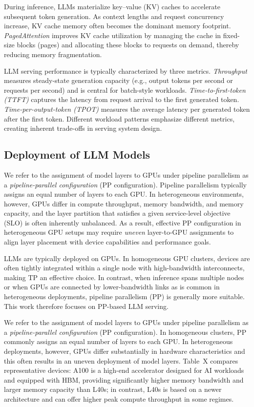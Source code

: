 \documentclass[sigplan,screen]{acmart}
\begin{document}
During inference, LLMs materialize key–value (KV) caches to accelerate subsequent token generation. As context lengths and request concurrency increase, KV cache memory often becomes the dominant memory footprint. \emph{PagedAttention} improves KV cache utilization by managing the cache in fixed-size blocks (pages) and allocating these blocks to requests on demand, thereby reducing memory fragmentation.

LLM serving performance is typically characterized by three metrics. \emph{Throughput} measures steady-state generation capacity (e.g., output tokens per second or requests per second) and is central for batch-style workloads. \emph{Time-to-first-token (TTFT)} captures the latency from request arrival to the first generated token. \emph{Time-per-output-token (TPOT)} measures the average latency per generated token after the first token. Different workload patterns emphasize different metrics, creating inherent trade-offs in serving system design.

\subsection{Deployment of LLM Models}
We refer to the assignment of model layers to GPUs under pipeline parallelism as a \emph{pipeline-parallel configuration} (PP configuration). Pipeline parallelism typically assigns an equal number of layers to each GPU. In heterogeneous environments, however, GPUs differ in compute throughput, memory bandwidth, and memory capacity, and the layer partition that satisfies a given service-level objective (SLO) is often inherently unbalanced. As a result, effective PP configuration in heterogeneous GPU setups may require \emph{uneven} layer-to-GPU assignments to align layer placement with device capabilities and performance goals.

LLMs are typically deployed on GPUs. In homogeneous GPU clusters, devices are often tightly integrated within a single node with high-bandwidth interconnects, making TP an effective choice. In contrast, when inference spans multiple nodes or when GPUs are connected by lower-bandwidth links as is common in heterogeneous deployments, pipeline parallelism (PP) is generally more suitable. This work therefore focuses on PP-based LLM serving.

We refer to the assignment of model layers to GPUs under pipeline parallelism as a \emph{pipeline-parallel configuration} (PP configuration). In homogeneous clusters, PP commonly assigns an equal number of layers to each GPU. In heterogeneous deployments, however, GPUs differ substantially in hardware characteristics and this often results in an uneven deployment of model layers. Table~X compares representative devices: A100 is a high-end accelerator designed for AI workloads and equipped with HBM, providing significantly higher memory bandwidth and  larger memory capacity than L40s; in contrast, L40s is based on a newer architecture and can offer higher peak compute throughput in some regimes.
\end{document}
